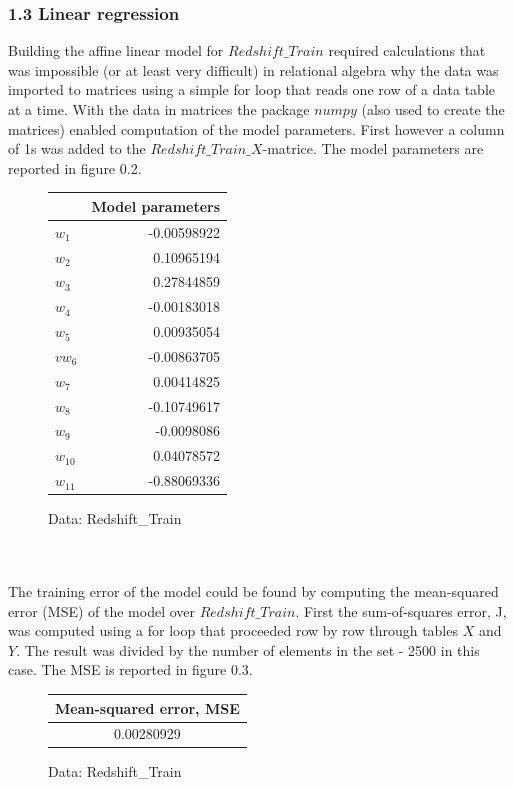 \documentclass[a4paper,danish,8pt,oneside,openany]{memoir}
\begin{document}
\subsubsection*{1.3 Linear regression}
Building the affine linear model for $Redshift\_Train$ required calculations that was impossible (or at least very difficult) in relational algebra why the data was imported to matrices using a simple for loop that reads one row of a data table at a time. With the data in matrices the package $numpy$ (also used to create the matrices) enabled computation of the model parameters. First however a column of 1s was added to the $Redshift\_Train\_X$-matrice. The model parameters are reported in figure 0.2.
\\
\begin{figure}[!h]
\centering
\begin{tabular}{|l|r|}
\hline
 & \textbf{Model parameters}\\ \hline
$w_1$ & -0.00598922 \\ \hline
$w_2$ & 0.10965194 \\ \hline
$w_3$ & 0.27844859 \\ \hline
$w_4$ & -0.00183018 \\ \hline
$w_5$ & 0.00935054 \\ \hline
$vw_6$ & -0.00863705 \\ \hline
$w_7$ & 0.00414825 \\ \hline
$w_8$ & -0.10749617 \\ \hline
$w_9$ & -0.0098086 \\ \hline
$w_10$ & 0.04078572 \\ \hline
$w_11$ & -0.88069336 \\ \hline
\end{tabular}
\caption{Data: Redshift\_Train}
\end{figure}
\\
\\
The training error of the model could be found by computing the mean-squared error (MSE) of the model over $Redshift\_Train$. First the sum-of-squares error, J, was computed using a for loop that proceeded row by row through tables $X$ and $Y$. The result was divided by the number of elements in the set - 2500 in this case. The MSE is reported in figure 0.3.
\\
\begin{figure}[!h]
\centering
\begin{tabular}{|c|}
\hline
\textbf{Mean-squared error, MSE} \\ \hline
0.00280929 \\ \hline
\end{tabular}
\caption{Data: Redshift\_Train}
\end{figure}
\end{document}
